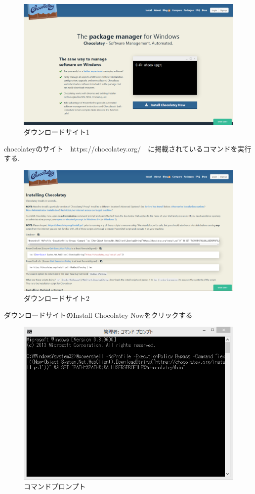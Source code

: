 \newpage


\begin{figure}[h]
\centering
\includegraphics[width=12cm]{choco2.PNG}
\caption{ダウンロードサイト1}\label{サンプル図}
\end{figure}

chocolateyのサイト　https://chocolatey.org/　に掲載されているコマンドを実行する.

\newpage

\begin{figure}[h]
\centering
\includegraphics[width=12cm]{choco3.PNG}
\caption{ダウンロードサイト2}\label{サンプル図}
\end{figure}

ダウンロードサイトのInstall Chocolatey Nowをクリックする



\newpage

\begin{figure}[h]
\centering
\includegraphics[width=12cm]{choco4.PNG}
\caption{コマンドプロンプト}\label{サンプル図}
\end{figure}

